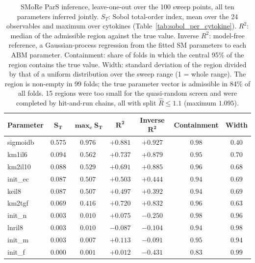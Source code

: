 \begin{table}[!htbp]
\caption{SMoRe ParS inference, leave-one-out over the 100 sweep points, all ten parameters inferred jointly. $S_T$: Sobol total-order index, mean over the 24 observables and maximum over cytokines (Table~\ref{tab:sobol_per_cytokine}). $R^2$: median of the admissible region against the true value. Inverse $R^2$: model-free reference, a Gaussian-process regression from the fitted SM parameters to each ABM parameter. Containment: share of folds in which the central 95\% of the region contains the true value. Width: standard deviation of the region divided by that of a uniform distribution over the sweep range (1 = whole range). The region is non-empty in 99 folds; the true parameter vector is admissible in 84\% of all folds. 15 regions were too small for the quasi-random screen and were completed by hit-and-run chains, all with split $\hat R \le 1.1$ (maximum $1.095$).}
\label{tab:recovery}
\centering\footnotesize
\setlength{\tabcolsep}{5pt}
\begin{tabular}{lcccccc}
\toprule
\textbf{Parameter} & $\mathbf{S_T}$ & $\mathbf{\max_c S_T}$ & $\mathbf{R^2}$ & \textbf{Inverse }$\mathbf{R^2}$ & \textbf{Containment} & \textbf{Width} \\
\midrule
sigmoidb & $0.575$ & $0.976$ & $+0.881$ & $+0.927$ & $0.98$ & $0.40$ \\
km1il6 & $0.094$ & $0.562$ & $+0.737$ & $+0.879$ & $0.95$ & $0.70$ \\
km2il10 & $0.088$ & $0.529$ & $+0.691$ & $+0.885$ & $0.96$ & $0.68$ \\
init\_ec & $0.087$ & $0.507$ & $+0.503$ & $+0.444$ & $0.94$ & $0.69$ \\
keil8 & $0.087$ & $0.507$ & $+0.497$ & $+0.392$ & $0.94$ & $0.69$ \\
km2tgf & $0.069$ & $0.416$ & $+0.720$ & $+0.832$ & $0.96$ & $0.63$ \\
init\_n & $0.003$ & $0.010$ & $+0.075$ & $-0.250$ & $0.98$ & $0.96$ \\
lnril8 & $0.003$ & $0.010$ & $-0.087$ & $-0.104$ & $0.94$ & $0.98$ \\
init\_m & $0.003$ & $0.007$ & $+0.113$ & $-0.091$ & $0.95$ & $0.94$ \\
init\_f & $0.000$ & $0.001$ & $+0.012$ & $-0.431$ & $0.83$ & $0.99$ \\
\bottomrule
\end{tabular}
\end{table}
